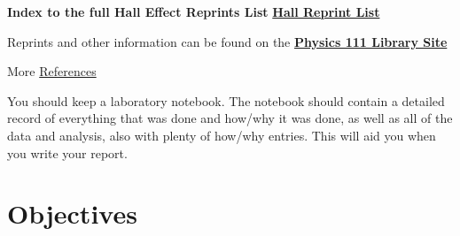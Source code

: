 \documentclass{../lab}
\begin{document}
\noindent\textbf{Index to the full Hall Effect Reprints List} \href{http://physics111.lib.berkeley.edu/Physics111/Reprints/HAL/HAL\_index.html}{\textbf{Hall Reprint List}}

\noindent Reprints and other information can be found on the \href{\LabReprints}{\textbf{Physics 111 Library Site}}

\noindent More \hyperref[sec:References]{References}

You should keep a laboratory notebook. The notebook should contain a detailed record of everything that was done and how/why it was done, as well as all of the data and analysis, also with plenty of how/why entries. This will aid you when you write your report.

\section{Objectives}
\end{document}

